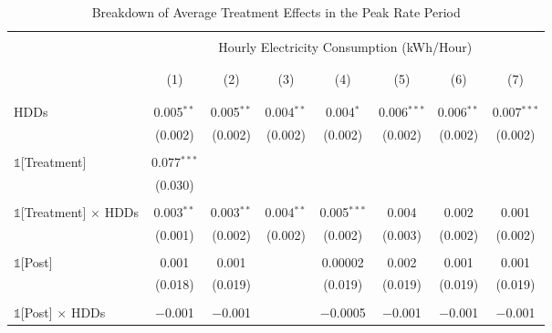 \begin{table}[!htbp]
\caption{Breakdown of Average Treatment Effects in the Peak Rate Period}
\label{Table:Breakdown-of-Average-Treatment-Effects-in-the-Peak-Rate-Period}
\centering
\small
\begin{adjustbox}{scale = 0.8}
\begin{tabular}{@{\extracolsep{5pt}}lccccccc}
\\[-5.5ex]
\hline \hline
\\[-3.0ex]
& \multicolumn{7}{c}{Hourly Electricity Consumption  (kWh/Hour)} \\
\\[-3.0ex]
\cline{2-8}
\\[-3.0ex]
& (1) & (2) & (3) & (4) & (5) & (6) & (7) \\
\\[-3.0ex]
\hline
\\[-2.0ex]
HDDs & 0.005$^{**}$ & 0.005$^{**}$ & 0.004$^{**}$ & 0.004$^{*}$ & 0.006$^{***}$ & 0.006$^{**}$ & 0.007$^{***}$ \\
& (0.002) & (0.002) & (0.002)  & (0.002) & (0.002) & (0.002) & (0.002) \\
& & & & & & & \\
$\mathbb{1}$[Treatment] & 0.077$^{***}$ & & \\
& (0.030) &  & \\
& & & & & & & \\
$\mathbb{1}$[Treatment] $\times$ HDDs & 0.003$^{**}$ & 0.003$^{**}$ & 0.004$^{**}$ & 0.005$^{***}$ & 0.004 & 0.002 & 0.001 \\
& (0.001) & (0.002) & (0.002) & (0.002) & (0.003) & (0.002) & (0.002) \\
& & & & & & & \\
$\mathbb{1}$[Post] & 0.001 & 0.001 & & 0.00002 & 0.002 & 0.001 & 0.001 \\
& (0.018) & (0.019) & & (0.019) & (0.019) & (0.019) & (0.019) \\
& & & & & & & \\
$\mathbb{1}$[Post] $\times$ HDDs & $-$0.001 & $-$0.001 & & $-$0.0005 & $-$0.001 & $-$0.001 & $-$0.001 \\

\end{tabular}
\end{adjustbox}
\end{table}
